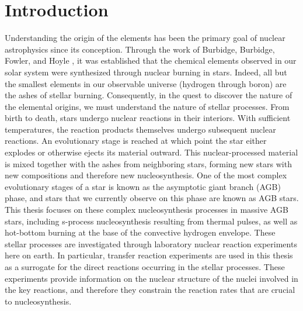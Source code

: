\chapter{\textbf{Introduction}}
\label{ch:intro}

Understanding the origin of the elements has been the primary goal of nuclear astrophysics since its conception. Through the work of Burbidge, Burbidge, Fowler, and Hoyle \cite{Burbidge1957}, it was established that the chemical elements observed in our solar system were synthesized through nuclear burning in stars. Indeed, all but the smallest elements in our observable universe (hydrogen through boron) are the ashes of stellar burning. Consequently, in the quest to discover the nature of the elemental origins, we must understand the nature of stellar processes. From birth to death, stars undergo nuclear reactions in their interiors. With sufficient temperatures, the reaction products themselves undergo subsequent nuclear reactions. An evolutionary stage is reached at which point the star either explodes or otherwise ejects its material outward. This nuclear-processed material is mixed together with the ashes from neighboring stars, forming new stars with new compositions and therefore new nucleosynthesis. One of the most complex evolutionary stages of a star is known as the asymptotic giant branch (AGB) phase, and stars that we currently observe on this phase are known as AGB stars. This thesis focuses on these complex nucleosynthesis processes in massive AGB stars, including s-process nucleosynthesis resulting from thermal pulses, as well as hot-bottom burning at the base of the convective hydrogen envelope. These stellar processes are investigated through laboratory nuclear reaction experiments here on earth. In particular, transfer reaction experiments are used in this thesis as a surrogate for the direct reactions occurring in the stellar processes. These experiments provide information on the nuclear structure of the nuclei involved in the key reactions, and therefore they constrain the reaction rates that are crucial to nucleosynthesis.

